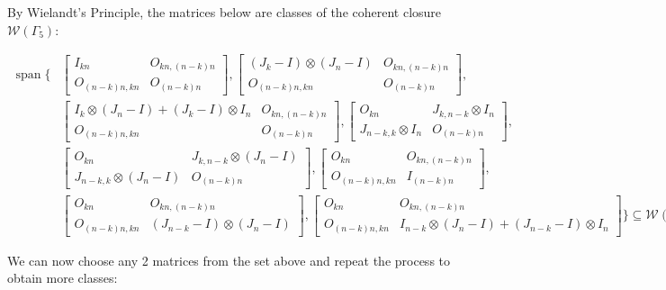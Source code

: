By Wielandt's Principle, the matrices below are classes of the coherent closure $\mathcal{W}(\Gamma_5)$:

\begin{align*}
    \operatorname{span}\{
    &\begin{bmatrix}
        I_{kn} & O_{kn, (n-k)n} \\
        O_{(n-k)n,kn} & O_{(n-k)n}
    \end{bmatrix},
    \begin{bmatrix}
        (J_k - I) \otimes (J_n - I) & O_{kn, (n-k)n} \\
        O_{(n-k)n,kn} & O_{(n-k)n}
    \end{bmatrix},\\
    &\begin{bmatrix}
        I_k\otimes(J_n-I) + (J_k-I) \otimes I_n & O_{kn, (n-k)n} \\
        O_{(n-k)n,kn} & O_{(n-k)n}
    \end{bmatrix},
    \begin{bmatrix}
        O_{kn} & J_{k,n-k} \otimes I_n \\
        J_{n-k,k}\otimes I_n & O_{(n-k)n}
    \end{bmatrix},\\
    &\begin{bmatrix}
        O_{kn} & J_{k,n-k} \otimes (J_n-I) \\
        J_{n-k,k}\otimes (J_n-I) & O_{(n-k)n}
    \end{bmatrix},
    \begin{bmatrix}
        O_{kn} & O_{kn, (n-k)n} \\
        O_{(n-k)n,kn} & I_{(n - k)n}
    \end{bmatrix},\\
    &\begin{bmatrix}
        O_{kn} & O_{kn, (n-k)n} \\
        O_{(n-k)n,kn} & (J_{n - k} - I) \otimes (J_n - I)
    \end{bmatrix},
    \begin{bmatrix}
        O_{kn} & O_{kn, (n-k)n} \\
        O_{(n-k)n,kn} & I_{n-k}\otimes(J_n-I)+(J_{n-k}-I)\otimes I_n
    \end{bmatrix}
    \}\subseteq\mathcal{W}(\Gamma_5).
\end{align*}

We can now choose any 2 matrices from the set above and repeat the process to obtain more classes:

